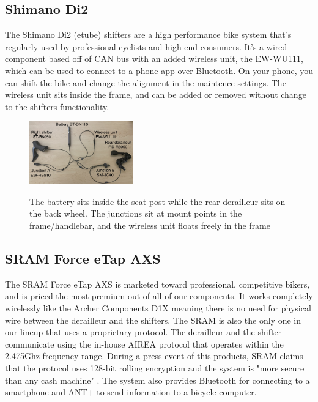 \documentclass[letterpaper,twocolumn,10pt]{article}
\begin{document}
\subsection{Shimano Di2}

The Shimano Di2 (etube) shifters are a high performance bike system that's regularly used by professional cyclists and high end consumers. It's a wired component based off of CAN bus with an added wireless unit, the EW-WU111, which can be used to connect to a phone app over Bluetooth. On your phone, you can shift the bike and change the alignment in the maintence settings. The wireless unit sits inside the frame, and can be added or removed without change to the shifters functionality.

\begin{figure}[ht]
  \begin{center}
    \centering
    \includegraphics[width=0.4\textwidth]{images/IMG_5264_Di2.jpg}
    \label{fig:Di2Setup}
  \end{center}
  \caption{The battery sits inside the seat post while the rear derailleur sits on the back wheel. The junctions sit at mount points in the frame/handlebar, and the wireless unit floats freely in the frame}
\end{figure}


\subsection{SRAM Force eTap AXS}
The SRAM Force eTap AXS \cite{etap} is marketed toward professional, competitive bikers, and is priced the most premium out of all of our components. It works completely wirelessly like the Archer Components D1X meaning there is no need for physical wire between the derailleur and the shifters. The SRAM is also the only one in our lineup that uses a proprietary protocol. The derailleur and the shifter communicate using the in-house AIREA protocol that operates within the 2.475Ghz frequency range. During a press event of this products, SRAM claims that  the protocol uses 128-bit rolling encryption and the system is "more secure than any cash machine" \cite{phillips2015SRAM}. The system also provides Bluetooth for connecting to a smartphone and ANT+ to send information to a bicycle computer.
\end{document}
